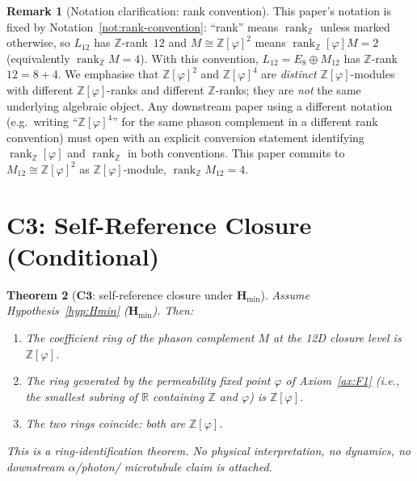 \documentclass[11pt, a4paper]{amsart}
\newtheorem{theorem}{Theorem}[section]
\theoremstyle{definition}
\newtheorem{remark}[theorem]{Remark}
\newcommand{\R}{\mathbb{R}}
\newcommand{\Z}{\mathbb{Z}}
\newcommand{\rk}{\operatorname{rank}}
\newcommand{\Hmin}{\mathbf{H}_{\min}}
\newcommand{\Ophi}{\mathbb{Z}[\varphi]}
\begin{document}
\begin{remark}[Notation clarification: rank convention]
\label{rmk:notation}
This paper's notation is fixed by
Notation~\ref{not:rank-convention}: ``rank'' means $\rk_\Z$ unless
marked otherwise, so $L_{12}$ has $\Z$-rank~$12$ and $M \cong
\Ophi^{2}$ means $\rk_\Ophi M = 2$ (equivalently $\rk_\Z M = 4$).
With this convention, $L_{12} = E_8 \oplus M_{12}$ has
$\Z$-rank~$12 = 8 + 4$. We emphasise that $\Ophi^{2}$ and
$\Ophi^{4}$ are \emph{distinct} $\Ophi$-modules with different
$\Ophi$-ranks and different $\Z$-ranks; they are \emph{not} the
same underlying algebraic object. Any downstream paper using a
different notation (e.g.\ writing ``$\Ophi^{4}$'' for the same
phason complement in a different rank convention) must open with
an explicit conversion statement identifying $\rk_\Ophi$ and
$\rk_\Z$ in both conventions. This paper commits to
$M_{12} \cong \Ophi^{2}$ as $\Ophi$-module, $\rk_\Z M_{12} = 4$.
\end{remark}

\section{$\mathbf{C3}$: Self-Reference Closure (Conditional)}
\label{sec:C3}

\begin{theorem}[$\mathbf{C3}$: self-reference closure under $\Hmin$]
\label{thm:C3}
Assume Hypothesis~\ref{hyp:Hmin} ($\Hmin$). Then:
\begin{enumerate}
\item[\textup{(a)}] The coefficient ring of the phason
  complement $M$ at the 12D closure level is $\Ophi$.
\item[\textup{(b)}] The ring generated by the permeability
  fixed point $\varphi$ of Axiom~\ref{ax:F1} (i.e., the
  smallest subring of $\R$ containing $\Z$ and $\varphi$) is
  $\Ophi$.
\item[\textup{(c)}] The two rings coincide: both are $\Ophi$.
\end{enumerate}
This is a ring-identification theorem. No physical
interpretation, no dynamics, no downstream $\alpha$/photon/
microtubule claim is attached.
\end{theorem}
\end{document}
